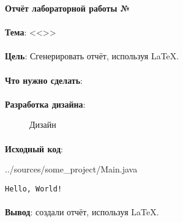 \documentclass[12pt, a4paper, simple]{eskdtext}
\def \gpiDocTopic {Отчёт лабораторной работы №\gpiDocNum}
\begin{document}
    


    \begin{center}
        \textbf{\gpiDocTopic}
    \end{center}


    \paragraph{} \textbf{Тема}: <<\gpiTopicRep>>


    \paragraph{} \textbf{Цель}: Сгенерировать отчёт, используя \LaTeX.


    \paragraph{} \textbf{Что нужно сделать}:



    \paragraph{} \textbf{Разработка дизайна}:


    \begin{figure}[!h]
        \centering
        \caption{Дизайн}
    \end{figure}


    \paragraph{} \textbf{Исходный код}: 

    
    {../sources/some_project/Main.java}


    \begin{lstlisting}[caption=Вывод в консоль]
Hello, World!
\end{lstlisting}


    \paragraph{} \textbf{Вывод}:
    создали отчёт, используя \LaTeX.


\end{document}
